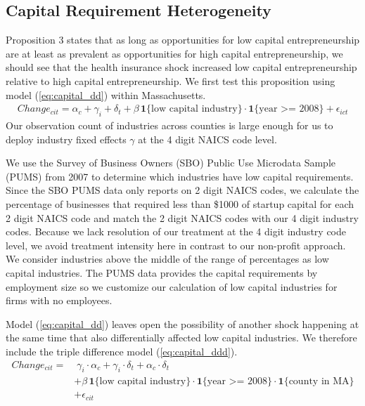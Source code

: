 \documentclass[12pt]{article}
\begin{document}
\subsection{Capital Requirement Heterogeneity}

Proposition 3 states that as long as opportunities for low capital entrepreneurship are at least as prevalent as opportunities for high capital entrepreneurship, we should see that the health insurance shock increased low capital entrepreneurship relative to high capital entrepreneurship. We first test this proposition using model (\ref{eq:capital_dd}) within Massachusetts. 
\begin{align} \label{eq:capital_dd}
Change_{cit} =  \alpha_c + \gamma_i+ \delta_t + \beta \, \mathbf{1}\{\text{low capital industry}\} \cdot \mathbf{1}\{\text{year >= 2008}\} + \epsilon_{ict}
\end{align}
Our observation count of industries across counties is large enough for us to deploy industry fixed effects $\gamma$ at the 4 digit NAICS code level. 

We use the Survey of Business Owners (SBO) Public Use Microdata Sample (PUMS) from 2007 to determine which industries have low capital requirements. Since the SBO PUMS data only reports on 2 digit NAICS codes, we calculate the percentage of businesses that required less than \$1000 of startup capital for each 2 digit NAICS code and match the 2 digit NAICS codes with our 4 digit industry codes. Because we lack resolution of our treatment at the 4 digit industry code level, we avoid treatment intensity here in contrast to our non-profit approach. We consider industries above the middle of the range of percentages as low capital industries. The PUMS data provides the capital requirements by employment size so we customize our calculation of low capital industries for firms with no employees. 

Model (\ref{eq:capital_dd}) leaves open the possibility of another shock happening at the same time that also differentially affected low capital industries. We therefore include the triple difference model (\ref{eq:capital_ddd}). 
\begin{align} \label{eq:capital_ddd}
Change_{cit} = & \; \gamma_i \cdot \alpha_c + \gamma_i \cdot \delta_t +  \alpha_c \cdot \delta_t \nonumber   \\
& + \beta \, \mathbf{1}\{\text{low capital industry}\} \cdot \mathbf{1}\{\text{year >= 2008}\}  \cdot \mathbf{1}\{\text{county in MA}\} \nonumber  \\
& + \epsilon_{cit}
\end{align}
\end{document}
